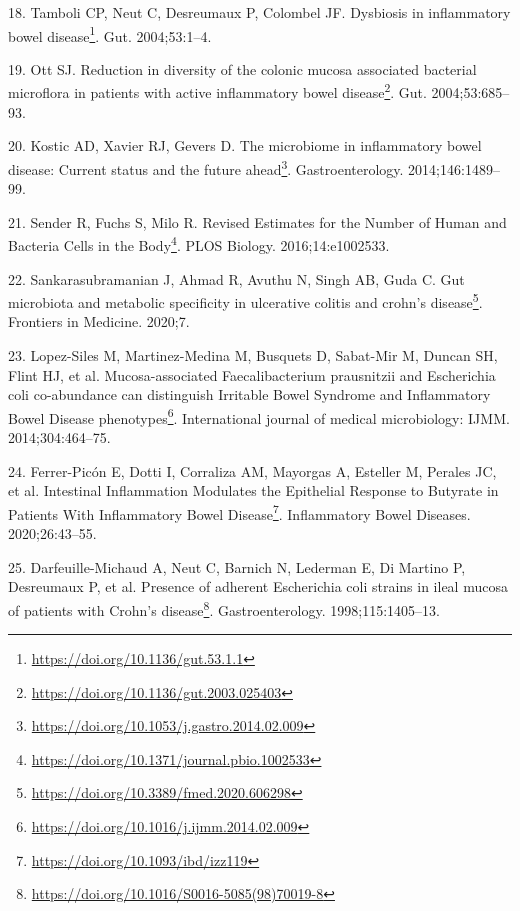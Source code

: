 \documentclass[
  a4paper,
]{book}
\DeclareRobustCommand{\href}[2]{#2\footnote{\url{#1}}}
\newlength{\cslhangindent}
\newlength{\cslentryspacingunit} %
\newenvironment{CSLReferences}[2] %
 {%
  \setlength{\parindent}{0pt}
  \ifodd #1
  \let\oldpar\par
  \def\par{\hangindent=\cslhangindent\oldpar}
  \fi
  \setlength{\parskip}{#2\cslentryspacingunit}
 }%
 {}
\begin{document}
\begin{CSLReferences}{0}{0}
\leavevmode{}%
18. Tamboli CP, Neut C, Desreumaux P, Colombel JF. \href{https://doi.org/10.1136/gut.53.1.1}{Dysbiosis in inflammatory bowel disease}. Gut. 2004;53:1--4.

\leavevmode{}%
19. Ott SJ. \href{https://doi.org/10.1136/gut.2003.025403}{Reduction in diversity of the colonic mucosa associated bacterial microflora in patients with active inflammatory bowel disease}. Gut. 2004;53:685--93.

\leavevmode{}%
20. Kostic AD, Xavier RJ, Gevers D. \href{https://doi.org/10.1053/j.gastro.2014.02.009}{The microbiome in inflammatory bowel disease: Current status and the future ahead}. Gastroenterology. 2014;146:1489--99.

\leavevmode{}%
21. Sender R, Fuchs S, Milo R. \href{https://doi.org/10.1371/journal.pbio.1002533}{Revised Estimates for the Number of Human and Bacteria Cells in the Body}. PLOS Biology. 2016;14:e1002533.

\leavevmode{}%
22. Sankarasubramanian J, Ahmad R, Avuthu N, Singh AB, Guda C. \href{https://doi.org/10.3389/fmed.2020.606298}{Gut microbiota and metabolic specificity in ulcerative colitis and crohn's disease}. Frontiers in Medicine. 2020;7.

\leavevmode{}%
23. Lopez-Siles M, Martinez-Medina M, Busquets D, Sabat-Mir M, Duncan SH, Flint HJ, et al. \href{https://doi.org/10.1016/j.ijmm.2014.02.009}{Mucosa-associated Faecalibacterium prausnitzii and Escherichia coli co-abundance can distinguish Irritable Bowel Syndrome and Inflammatory Bowel Disease phenotypes}. International journal of medical microbiology: IJMM. 2014;304:464--75.

\leavevmode{}%
24. Ferrer-Picón E, Dotti I, Corraliza AM, Mayorgas A, Esteller M, Perales JC, et al. \href{https://doi.org/10.1093/ibd/izz119}{Intestinal Inflammation Modulates the Epithelial Response to Butyrate in Patients With Inflammatory Bowel Disease}. Inflammatory Bowel Diseases. 2020;26:43--55.

\leavevmode{}%
25. Darfeuille-Michaud A, Neut C, Barnich N, Lederman E, Di Martino P, Desreumaux P, et al. \href{https://doi.org/10.1016/S0016-5085(98)70019-8}{Presence of adherent Escherichia coli strains in ileal mucosa of patients with Crohn's disease}. Gastroenterology. 1998;115:1405--13.


\end{CSLReferences}
\end{document}

